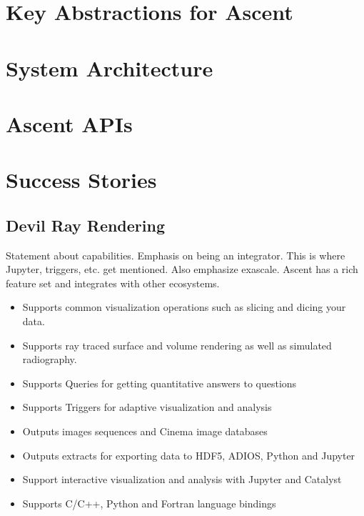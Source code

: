 \section{Key Abstractions for Ascent}
\label{sec:capabilities}


\section{System Architecture}
\label{sec:design}


\section{Ascent APIs}
\label{sec:API}


\section{Success Stories}
\label{sec:success}


\subsection{Devil Ray Rendering}
\label{sec:DevilRay}




Statement about capabilities.  Emphasis on being an integrator.
This is where Jupyter, triggers, etc. get mentioned.  Also emphasize
exascale.
Ascent has a rich feature set and integrates with other ecosystems.

\begin{itemize}
  \item Supports common visualization operations such as slicing and dicing your data.
  \item Supports ray traced surface and volume rendering as well as simulated radiography.
  \item Supports Queries for getting quantitative answers to questions
  \item Supports Triggers for adaptive visualization and analysis
  \item Outputs images sequences and Cinema image databases
  \item Outputs extracts for exporting data to HDF5, ADIOS, Python and Jupyter
  \item Support interactive visualization and analysis with Jupyter and Catalyst
  \item Supports C/C++, Python and Fortran language bindings
\end{itemize}

